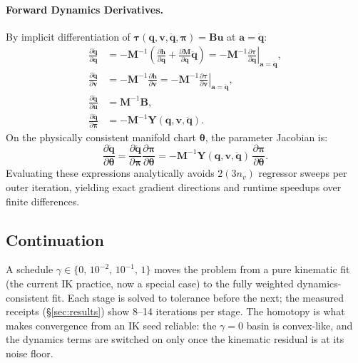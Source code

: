 \documentclass[11pt,a4paper]{article}
\newcommand{\bq}{\mathbf{q}}
\newcommand{\bv}{\mathbf{v}}
\newcommand{\ba}{\mathbf{a}}
\newcommand{\bu}{\mathbf{u}}
\newcommand{\bh}{\mathbf{h}}
\newcommand{\bM}{\mathbf{M}}
\newcommand{\bY}{\mathbf{Y}}
\newcommand{\bB}{\mathbf{B}}
\newcommand{\bpi}{\boldsymbol{\pi}}
\newcommand{\btheta}{\boldsymbol{\theta}}
\begin{document}
\paragraph{Forward Dynamics Derivatives.}
By implicit differentiation of $\boldsymbol{\tau}(\bq, \bv, \ddot{\bq}, \bpi) = \bB\bu$ at $\ba = \ddot{\bq}$:
\begin{align}
  \frac{\partial \ddot{\bq}}{\partial \bq} &= -\bM^{-1}\left( \frac{\partial \bh}{\partial \bq} + \frac{\partial \bM}{\partial \bq}\ddot{\bq} \right)
  = -\bM^{-1} \left. \frac{\partial \boldsymbol{\tau}}{\partial \bq} \right|_{\ba = \ddot{\bq}} , \\
  \frac{\partial \ddot{\bq}}{\partial \bv} &= -\bM^{-1}\frac{\partial \bh}{\partial \bv}
  = -\bM^{-1} \left. \frac{\partial \boldsymbol{\tau}}{\partial \bv} \right|_{\ba = \ddot{\bq}} , \\
  \frac{\partial \ddot{\bq}}{\partial \bu} &= \bM^{-1}\bB , \\
  \frac{\partial \ddot{\bq}}{\partial \bpi} &= -\bM^{-1} \bY(\bq, \bv, \ddot{\bq}) .
\end{align}
On the physically consistent manifold chart $\btheta$, the parameter Jacobian is:
\begin{equation}
  \frac{\partial \ddot{\bq}}{\partial \btheta} = \frac{\partial \ddot{\bq}}{\partial \bpi} \frac{\partial \bpi}{\partial \btheta}
  = -\bM^{-1}\bY(\bq, \bv, \ddot{\bq})\, \frac{\partial \bpi}{\partial \btheta} .
\end{equation}
Evaluating these expressions analytically avoids $2(3n_v)$ regressor sweeps per outer iteration,
yielding exact gradient directions and runtime speedups over finite differences.

\subsection{Continuation}
A schedule $\gamma\in\{0,\,10^{-2},\,10^{-1},\,1\}$ moves the problem from a
pure kinematic fit (the current IK practice, now a special case) to the fully
weighted dynamics-consistent fit.  Each stage is solved to tolerance before the
next; the measured receipts (\S\ref{sec:results}) show 8--14 iterations per
stage.  The homotopy is what makes convergence from an IK seed reliable: the
$\gamma=0$ basin is convex-like, and the dynamics terms are switched on only
once the kinematic residual is at its noise floor.
\end{document}
